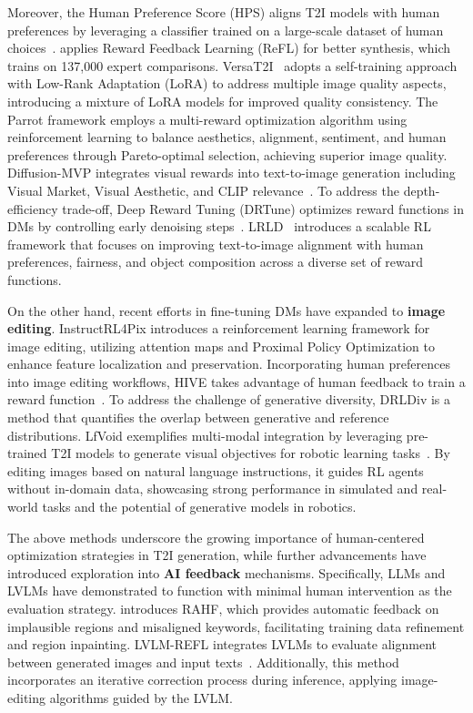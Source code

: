 Moreover, the Human Preference Score (HPS) aligns T2I models with human preferences by leveraging a classifier trained on a large-scale dataset of human choices~\citep{wu2023human}. \citet{xu2024imagereward} applies Reward Feedback Learning (ReFL) for better synthesis, which trains on 137,000 expert comparisons. VersaT2I~\citep{guo2024versat2i} adopts a self-training approach with Low-Rank Adaptation (LoRA) to address multiple image quality aspects, introducing a mixture of LoRA models for improved quality consistency. The Parrot framework \citep{lee2025parrot} employs a multi-reward optimization algorithm using reinforcement learning to balance aesthetics, alignment, sentiment, and human preferences through Pareto-optimal selection, achieving superior image quality. Diffusion-MVP integrates visual rewards into text-to-image generation including Visual Market, Visual Aesthetic, and CLIP relevance~\citep{he2023learning}.  To address the depth-efficiency trade-off, Deep Reward Tuning (DRTune) optimizes reward functions in DMs by controlling early denoising steps~\citep{wu2025deep}. LRLD~\citep{zhang2025large} introduces a scalable RL framework that focuses on improving text-to-image alignment with human preferences, fairness, and object composition across a
diverse set of reward functions. 

On the other hand, recent efforts in fine-tuning DMs have expanded to \textbf{image editing}. InstructRL4Pix \citep{li2024instructrl4pix} introduces a reinforcement learning framework for image editing, utilizing attention maps and Proximal Policy Optimization to enhance feature localization and preservation. Incorporating human preferences into image editing workflows, HIVE takes advantage of human feedback to train a reward function~\citep{zhang2024hive}. To address the challenge of generative diversity, DRLDiv \citep{miao2024training} is a method that quantifies the overlap between generative and reference distributions. LfVoid exemplifies multi-modal integration by leveraging pre-trained T2I models to generate visual objectives for robotic learning tasks~\citep{gao2023can}. By editing images based on natural language instructions, it guides RL agents without in-domain data, showcasing strong performance in simulated and real-world tasks and the potential of generative models in robotics.

The above methods underscore the growing importance of human-centered optimization strategies in T2I generation, while further advancements have introduced exploration into \textbf{AI feedback} mechanisms. Specifically, LLMs and LVLMs have demonstrated to function with minimal human intervention as the evaluation strategy. 
\citet{liang2024rich} introduces RAHF, which provides automatic feedback on implausible regions and misaligned keywords, facilitating training data refinement and region inpainting. LVLM-REFL integrates LVLMs to evaluate alignment between generated images and input texts~\citep{wen2023improving}. Additionally, this method incorporates an iterative correction process during inference, applying image-editing algorithms guided by the LVLM.    


